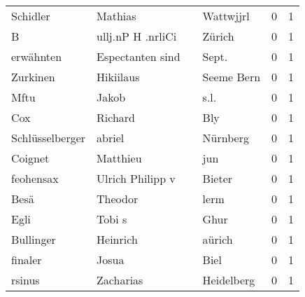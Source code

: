 \begin{center}
\begin{tiny}
\begin{longtabu}{llllrr}
                 Schidler &                            Mathias &             &                                   Wattwjjrl &          0 &         1 \\
                        B &                  ullj.nP H .nrliCi &             &                                      Zürich &          0 &         1 \\
                erwähnten &                   Espectanten sind &             &                                      Sept.  &          0 &         1 \\
                 Zurkinen &                          Hikiilaus &             &                                  Seeme Bern &          0 &         1 \\
                     Mftu &                              Jakob &             &                                        s.l. &          0 &         1 \\
                      Cox &                            Richard &             &                                         Bly &          0 &         1 \\
          Schlüsselberger &                             abriel &             &                                    Nürnberg &          0 &         1 \\
                  Coignet &                           Matthieu &             &                                         jun &          0 &         1 \\
                feohensax &                   Ulrich Philipp v &             &                                      Bieter &          0 &         1 \\
                     Besä &                            Theodor &             &                                        lerm &          0 &         1 \\
                     Egli &                             Tobi s &             &                                        Ghur &          0 &         1 \\
                Bullinger &                           Heinrich &             &                                      aürich &          0 &         1 \\
                  finaler &                              Josua &             &                                        Biel &          0 &         1 \\
                   rsinus &                          Zacharias &             &                                  Heidelberg &          0 &         1 \\

\end{longtabu}
\end{tiny}
\end{center}
